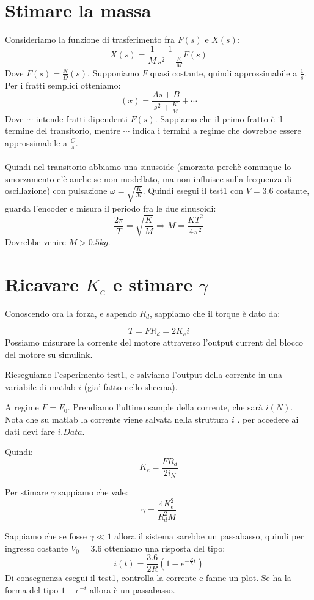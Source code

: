 \documentclass[10pt,a4paper]{article}
\begin{document}
\section{Stimare la massa}
Consideriamo la funzione di trasferimento fra $F(s)$ e $X(s)$:
$$X(s)= \frac{1}{M}\frac{1}{s^2+\frac{K}{M}}F(s)$$
Dove $F(s) = \frac{N}{D}(s)$. Supponiamo $F$ quasi costante, quindi approssimabile a $\frac{1}{s}$. Per i fratti semplici otteniamo:
$$(x) = \frac{As+B}{s^2+\frac{K}{M}}+\cdots$$
Dove $\cdots$ intende fratti dipendenti $F(s)$. Sappiamo che il primo fratto è il termine del transitorio, mentre $\cdots$  indica i termini a regime che dovrebbe essere approssimabile a $\frac{C}{s}$. \\ \\
Quindi nel transitorio abbiamo una sinusoide (smorzata perchè comunque lo smorzamento c'è anche se non modellato, ma non influisce sulla frequenza di oscillazione) con pulsazione $\omega = \sqrt{\frac{K}{M}}$. Quindi esegui il test1 con $V=3.6$ costante, guarda l'encoder e misura il periodo fra le due sinusoidi:
$$\frac{2\pi}{T}= \sqrt{\frac{K}{M}} \Rightarrow M = \frac{KT^2}{4\pi^2}$$
Dovrebbe venire $M > 0.5kg$.
\newpage
\section{Ricavare $K_e$ e stimare $\gamma$}
Conoscendo ora la forza, e sapendo $R_d$, sappiamo che il torque è dato da:

$$T = FR_d = 2K_e i$$
Possiamo misurare la corrente del motore attraverso l'output current del blocco del motore su simulink.

Rieseguiamo l'esperimento test1, e salviamo l'output della corrente in una variabile di matlab $i$ (gia' fatto nello shcema).

A regime $F=F_0$. Prendiamo l'ultimo sample della corrente, che sarà $i(N)$. Nota che su matlab la corrente viene salvata nella struttura $i$ . per accedere ai dati devi fare $i.Data$.

 Quindi:
$$K_e = \frac{FR_d}{2i_N}$$

Per stimare $\gamma$ sappiamo che vale:
$$\gamma = \frac{4K_e^2}{R_d^2M}$$

Sappiamo che se fosse $\gamma \ll 1$ allora il sistema sarebbe un passabasso, quindi per ingresso costante $V_0=3.6$ otteniamo una risposta del tipo:
$$i(t) = \frac{3.6}{2R}(1-e^{-\frac{R}{L}t})$$
Di conseguenza esegui il test1, controlla la corrente e fanne un plot. Se ha la forma del tipo $1-e^{-t}$ allora è un passabasso.
\end{document}

